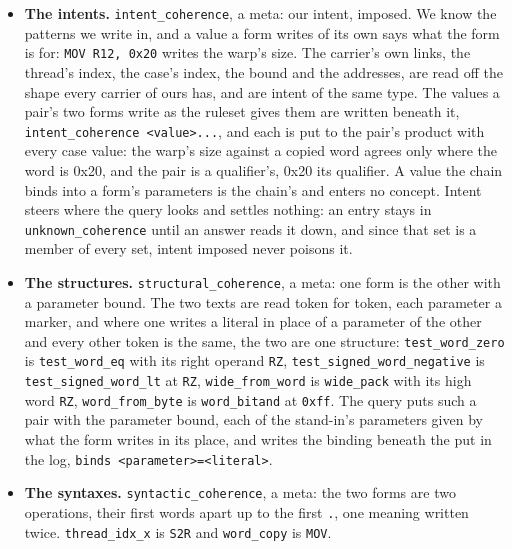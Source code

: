 \begin{itemize}
\item \textbf{The intents.} \texttt{intent\_\allowbreak{}coherence}, a meta: our intent, imposed. We know the patterns we write in, and a value a form writes of its own says what the form is for: \texttt{MOV R12, 0x20} writes the warp's size. The carrier's own links, the thread's index, the case's index, the bound and the addresses, are read off the shape every carrier of ours has, and are intent of the same type. The values a pair's two forms write as the ruleset gives them are written beneath it, \texttt{intent\_\allowbreak{}coherence <value>.\allowbreak{}.\allowbreak{}.\allowbreak{}}, and each is put to the pair's product with every case value: the warp's size against a copied word agrees only where the word is 0x20, and the pair is a qualifier's, 0x20 its qualifier. A value the chain binds into a form's parameters is the chain's and enters no concept. Intent steers where the query looks and settles nothing: an entry stays in \texttt{unknown\_\allowbreak{}coherence} until an answer reads it down, and since that set is a member of every set, intent imposed never poisons it.
\item \textbf{The structures.} \texttt{structural\_\allowbreak{}coherence}, a meta: one form is the other with a parameter bound. The two texts are read token for token, each parameter a marker, and where one writes a literal in place of a parameter of the other and every other token is the same, the two are one structure: \texttt{test\_\allowbreak{}word\_\allowbreak{}zero} is \texttt{test\_\allowbreak{}word\_\allowbreak{}eq} with its right operand \texttt{RZ}, \texttt{test\_\allowbreak{}signed\_\allowbreak{}word\_\allowbreak{}negative} is \texttt{test\_\allowbreak{}signed\_\allowbreak{}word\_\allowbreak{}lt} at \texttt{RZ}, \texttt{wide\_\allowbreak{}from\_\allowbreak{}word} is \texttt{wide\_\allowbreak{}pack} with its high word \texttt{RZ}, \texttt{word\_\allowbreak{}from\_\allowbreak{}byte} is \texttt{word\_\allowbreak{}bitand} at \texttt{0xff}. The query puts such a pair with the parameter bound, each of the stand-in's parameters given by what the form writes in its place, and writes the binding beneath the put in the log, \texttt{binds <parameter>=<literal>}.
\item \textbf{The syntaxes.} \texttt{syntactic\_\allowbreak{}coherence}, a meta: the two forms are two operations, their first words apart up to the first \texttt{.\allowbreak{}}, one meaning written twice. \texttt{thread\_\allowbreak{}idx\_\allowbreak{}x} is \texttt{S2R} and \texttt{word\_\allowbreak{}copy} is \texttt{MOV}.

\end{itemize}
